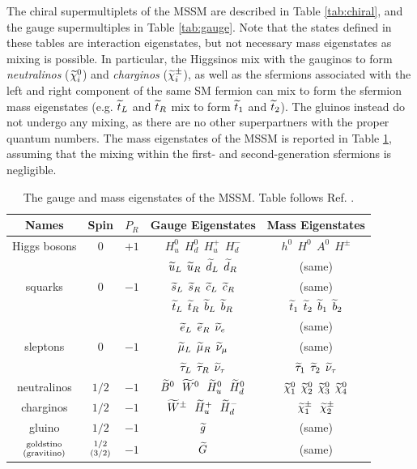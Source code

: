 The chiral supermultiplets of the MSSM are described in Table \ref{tab:chiral}, and the gauge supermultiples in Table \ref{tab:gauge}. Note that the states defined in these tables are interaction eigenstates, but not necessary mass eigenstates as mixing is possible. In particular, the Higgsinos mix with the gauginos to form \textit{neutralinos} ($\widetilde{\chi}^0_i$) and \textit{charginos} ($\widetilde{\chi}^\pm_i$), as well as the sfermions associated with the left and right component of the same SM fermion can mix to form the sfermion mass eigenstates (e.g. $\widetilde{t}_L$ and $\widetilde{t}_R$ mix to form $\widetilde{t}_1$ and $\widetilde{t}_2$). The gluinos instead do not undergo any mixing, as there are no other superpartners with the proper quantum numbers. The mass eigenstates of the MSSM is reported in Table \ref{tab:undiscovered}, assuming that the mixing within the first- and second-generation sfermions is negligible.


\begin{table}[tb]
\begin{center}
\begin{tabular}{c c c c c }
\hline
Names & Spin & $P_R$ & Gauge Eigenstates & Mass Eigenstates \\
\hline\hline
Higgs bosons & 0 & $+1$ & 
$H_u^0\>\> H_d^0\>\> H_u^+ \>\> H_d^-$ 
& 
$h^0\>\> H^0\>\> A^0 \>\> H^\pm$
\\ \hline
& & &${\widetilde u}_L\>\> {\widetilde u}_R\>\> \widetilde d_L\>\> \widetilde d_R$&(same)
\\
squarks& 0&$-1$& ${\widetilde s}_L\>\> {\widetilde s}_R\>\> \widetilde c_L\>\>
\widetilde c_R$& (same) \\
& & &
$\widetilde t_L \>\>\widetilde t_R \>\>\widetilde b_L\>\> \widetilde b_R$ 
&
${\widetilde t}_1\>\> {\widetilde t}_2\>\> \widetilde b_1\>\> \widetilde b_2$
\\ \hline
& & &${\widetilde e}_L\>\> {\widetilde e}_R \>\>\widetilde \nu_e$&(same) 
\\
sleptons& 0&$-1$&${\widetilde \mu}_L\>\>{\widetilde \mu}_R\>\>\widetilde\nu_\mu$&(same)
\\
& & &
$\widetilde \tau_L\>\> \widetilde \tau_R \>\>\widetilde \nu_\tau$ 
&
${\widetilde \tau}_1 \>\>{\widetilde \tau}_2 \>\>\widetilde \nu_\tau$
\\
\hline
neutralinos & $1/2$&$-1$ & 
$\widetilde B^0 \>\>\>\widetilde W^0\>\>\> \widetilde H_u^0\>\>\> \widetilde H_d^0$   
&
$\widetilde \chi^0_1\>\> \widetilde \chi^0_2 \>\>\widetilde \chi^0_3\>\> \widetilde \chi^0_4$ 
\\
\hline
charginos & $1/2$&$-1$ & 
$\widetilde W^\pm\>\>\> \widetilde H_u^+ \>\>\>\widetilde H_d^-$ 
&
$\widetilde \chi_1^\pm\>\>\>\widetilde \chi_2^\pm $ 
\\
\hline
gluino & $1/2$&$-1$ &$\widetilde g$  &(same) \\
\hline
${\rm goldstino}\atop{\rm (gravitino)}$ & ${1/2}\atop{(3/2)}$&$-1$&$\widetilde 
G$  &(same) \\
\hline
\end{tabular}
\caption{The gauge and mass eigenstates of the MSSM. Table follows Ref. \cite{Martin:1997ns}. 
\label{tab:undiscovered}}
\vspace{-0.4cm}
\end{center}
\end{table}%

